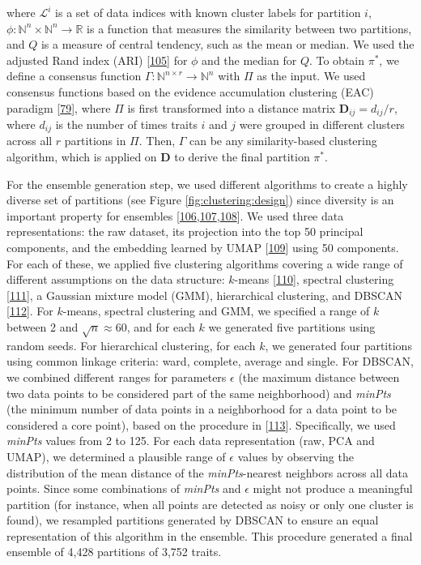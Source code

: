 \documentclass[
  legalpaperpaper,
]{article}
\begin{document}
where \(\mathcal{L}^i\) is a set of data indices with known cluster labels for partition \(i\),
\(\phi\colon \mathbb{N}^n \times \mathbb{N}^n \to \mathbb{R}\) is a function that measures the similarity between two partitions,
and \(Q\) is a measure of central tendency, such as the mean or median.
We used the adjusted Rand index (ARI) {[}\protect\hyperlink{ref-e4AuoW8N}{105}{]} for \(\phi\) and the median for \(Q\).
To obtain \(\pi^*\), we define a consensus function \(\Gamma\colon \mathbb{N}^{n \times r} \to \mathbb{N}^n\) with \(\Pi\) as the input.
We used consensus functions based on the evidence accumulation clustering (EAC) paradigm {[}\protect\hyperlink{ref-cuROQDFa}{79}{]}, where \(\Pi\) is first transformed into a distance matrix
\(\mathbf{D}_{ij} = d_{ij} / r\),
where \(d_{ij}\) is the number of times traits \(i\) and \(j\) were grouped in different clusters across all \(r\) partitions in \(\Pi\).
Then, \(\Gamma\) can be any similarity-based clustering algorithm, which is applied on \(\mathbf{D}\) to derive the final partition \(\pi^*\).

For the ensemble generation step, we used different algorithms to create a highly diverse set of partitions (see Figure \ref{fig:clustering:design}) since diversity is an important property for ensembles {[}\protect\hyperlink{ref-8js8Q3pF}{106},\protect\hyperlink{ref-rcTMvL18}{107},\protect\hyperlink{ref-t5p3UpxZ}{108}{]}.
We used three data representations: the raw dataset, its projection into the top 50 principal components, and the embedding learned by UMAP {[}\protect\hyperlink{ref-157h5hA34}{109}{]} using 50 components.
For each of these, we applied five clustering algorithms covering a wide range of different assumptions on the data structure: \(k\)-means {[}\protect\hyperlink{ref-MxGpAiPu}{110}{]}, spectral clustering {[}\protect\hyperlink{ref-x3CT24TB}{111}{]}, a Gaussian mixture model (GMM), hierarchical clustering, and DBSCAN {[}\protect\hyperlink{ref-JrL3iQea}{112}{]}.
For \(k\)-means, spectral clustering and GMM, we specified a range of \(k\) between 2 and \(\sqrt{n} \approx 60\), and for each \(k\) we generated five partitions using random seeds.
For hierarchical clustering, for each \(k\), we generated four partitions using common linkage criteria: ward, complete, average and single.
For DBSCAN, we combined different ranges for parameters \(\epsilon\) (the maximum distance between two data points to be considered part of the same neighborhood) and \emph{minPts} (the minimum number of data points in a neighborhood for a data point to be considered a core point), based on the procedure in {[}\protect\hyperlink{ref-FB7XPWl6}{113}{]}.
Specifically, we used \emph{minPts} values from 2 to 125.
For each data representation (raw, PCA and UMAP), we determined a plausible range of \(\epsilon\) values by observing the distribution of the mean distance of the \emph{minPts}-nearest neighbors across all data points.
Since some combinations of \emph{minPts} and \(\epsilon\) might not produce a meaningful partition (for instance, when all points are detected as noisy or only one cluster is found), we resampled partitions generated by DBSCAN to ensure an equal representation of this algorithm in the ensemble.
This procedure generated a final ensemble of 4,428 partitions of 3,752 traits.
\end{document}
